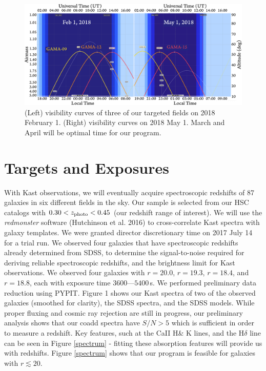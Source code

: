 \documentclass[letterpaper,12pt]{article}
\begin{document}
\begin{figure}[hbt]
\includegraphics[width=\textwidth]{specz_fig3.pdf}
\caption{
(Left) visibility curves of three of our targeted fields on 2018 February 1. (Right) visibility curves on 2018
May 1. March and April will be optimal time for our program.}
\end{figure}

\clearpage

\section{Targets and Exposures}

With Kast observations, we will eventually acquire spectroscopic redshifts of 87 galaxies in six different fields in
the sky. Our sample is selected from our HSC catalogs with  $0.30<z_{\rm photo}<0.45$ (our redshift range of interest). We
will use the {\it redmonster} software (Hutchinson et al. 2016) to cross-correlate Kast spectra with galaxy
templates. We were granted director discretionary time on 2017 July 14 for a trial run. We observed four galaxies that
have spectroscopic redshifts already determined from SDSS, to determine the signal-to-noise required for deriving
reliable spectroscopic redshifts, and the brightness limit for Kast observations. We observed four galaxies with $r=20.0$, $r=19.3$, $r=18.4$, and $r=18.8$, each with exposure time $3600\textrm{---}5400$\,s. We performed
preliminary data reduction using PYPIT. Figure 1 shows our Kast spectra of two of the observed galaxies (smoothed for
clarity), the SDSS spectra, and the SDSS models. While proper fluxing and cosmic ray rejection are still in progress, our preliminary analysis shows that our coadd spectra have  $S/N>5$ which is sufficient in order to measure a redshift. Key features, such at the CaII H\& K lines, and the H$\delta$ line can be seen in Figure \ref{spectrum} - fitting these absorption features will provide us with redshifts. Figure \ref{spectrum} shows that our program is
feasible for galaxies with $r\lesssim20$.
\end{document}
